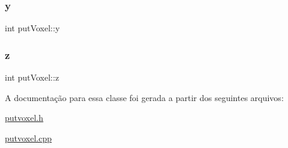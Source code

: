 \subsubsection{\texorpdfstring{y}{y}}
{\footnotesize\ttfamily int put\+Voxel\+::y\hspace{0.3cm}{\ttfamily [protected]}}

\mbox{\label{classput_voxel_a5662d2dce87f60fb8df112dfda270a21}} 
\subsubsection{\texorpdfstring{z}{z}}
{\footnotesize\ttfamily int put\+Voxel\+::z\hspace{0.3cm}{\ttfamily [protected]}}



A documentação para essa classe foi gerada a partir dos seguintes arquivos\+:\begin{DoxyCompactItemize}
\item 
\mbox{\hyperlink{putvoxel_8h}{putvoxel.\+h}}\item 
\mbox{\hyperlink{putvoxel_8cpp}{putvoxel.\+cpp}}\end{DoxyCompactItemize}
